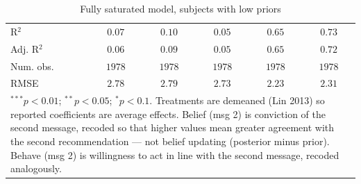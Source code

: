 \begin{table}
\begin{center}
\begin{tabular}{l c c c c c}
\hline
R$^2$                                             & $0.07$        & $0.10$        & $0.05$       & $0.65$        & $0.73$       \\
Adj. R$^2$                                        & $0.06$        & $0.09$        & $0.05$       & $0.65$        & $0.72$       \\
Num. obs.                                         & $1978$        & $1978$        & $1978$       & $1978$        & $1978$       \\
RMSE                                              & $2.78$        & $2.79$        & $2.73$       & $2.23$        & $2.31$       \\
\hline
\multicolumn{6}{l}{\scriptsize{\item $^{***}p<0.01$; $^{**}p<0.05$; $^{*}p<0.1$. Treatments are demeaned (Lin 2013) so reported coefficients are average effects. Belief (msg 2) is conviction of the second message, recoded so that higher values mean greater agreement with the second recommendation --- not belief updating (posterior minus prior). Behave (msg 2) is willingness to act in line with the second message, recoded analogously.}}
\end{tabular}
\caption{Fully saturated model, subjects with low priors}
\label{tab:saturated_low_priors}
\end{center}
\end{table}

